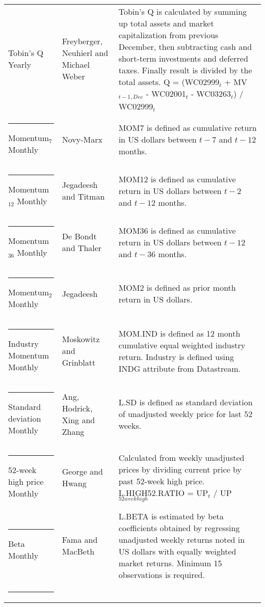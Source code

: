 \documentclass{article}
\begin{document}
{{\begin{xltabular}{\textwidth}{ >{\raggedright\arraybackslash}p{0.23\textwidth} >{\raggedright\arraybackslash}p{0.2\textwidth} X}
Tobin's Q 	\newline Yearly			& Freyberger, Neuhierl and Michael Weber \citeyear{	Freyberger2020} & Tobin's Q is calculated by summing up total assets and market capitalization from previous December, then subtracting cash and short-term investments and deferred taxes. Finally result is divided by the total assets. \newline Q = (WC02999$_{t}$ + MV$_{t-1, Dec}$ - WC02001$_{t}$ - WC03263$_{t}$) / WC02999$_{t}$ \\ \rule{-1ex}{3ex}
Momentum$_{7}$ \newline Monthly	& Novy-Marx \citeyear{NOVYMARX2012}			& MOM7 is defined as cumulative return in US dollars between $t-7$ and $t-12$ months.\\ \rule{-1ex}{3ex}
Momentum$_{12}$ \newline Monthly	& Jegadeesh and Titman \citeyear{Jegadeesh1993}	& MOM12 is defined as cumulative return in US dollars between $t-2$ and $t-12$ months.\\ \rule{-1ex}{3ex}
Momentum$_{36}$ \newline Monthly	& De Bondt and Thaler \citeyear{DeBondt1985}		& MOM36 is defined as cumulative return in US dollars between $t-12$ and $t-36$ months.\\ \rule{-1ex}{3ex}
Momentum$_{2}$ \newline Monthly	& Jegadeesh \citeyear{Jegadeesh1990}			& MOM2 is defined as prior month return in US dollars.\\ \rule{-1ex}{3ex}
Industry Momentum \newline Monthly & Moskowitz and Grinblatt \citeyear{Moskowitz1999}	 & MOM.IND is defined as 12 month cumulative equal weighted industry return. Industry is defined using INDG attribute from Datastream. \\ \rule{-1ex}{3ex}
Standard deviation \newline Monthly	& Ang, Hodrick, Xing and Zhang \citeyear{ang2006}	& L.SD is defined as standard deviation of unadjusted weekly price for last 52 weeks. \\ \rule{-1ex}{3ex}
52-week high price \newline Monthly	& George and Hwang \citeyear{george2004}	& Calculated from weekly unadjusted prices by dividing current price by past 52-week high price. \newline  L.HIGH52.RATIO = UP$_{t}$ / UP$_{52 week high}$\\ \rule{-1ex}{3ex}
Beta	 \newline Monthly			& Fama and MacBeth \citeyear{FamaMacBeth1973}	& L.BETA is estimated by beta coefficients obtained by regressing unadjusted weekly returns noted in US dollars with equally weighted market returns. Minimum 15 observations is required.\\ \rule{-1ex}{3ex}

\end{xltabular}}}
\end{document}
